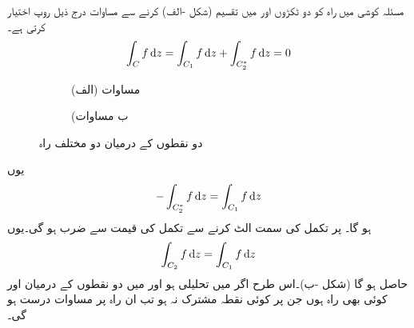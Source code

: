 مسئلہ کوشی میں راہ  کو دو ٹکڑوں  اور  میں تقسیم (شکل -الف) کرنے سے مساوات  درج ذیل روپ اختیار کرتی ہے۔
\begin{align*}
\int_C f\dif z=\int_{C_1} f\dif z+\int_{C^*_2}f\dif z=0
\end{align*}
%
\begin{figure}
\centering
\begin{subfigure}{0.5\textwidth}
\centering
{}
\caption*{(الف) مساوات }
\end{subfigure}%
\begin{subfigure}{0.5\textwidth}
\centering
{}
\caption*{(ب مساوات }
\end{subfigure}%
\caption{دو نقطوں کے درمیان دو مختلف راہ}
\label{شکل_مخلوط_تکمل_مختلف_راہ}
\end{figure}
یوں
\begin{align}\label{مساوات_مخلوط_تکمل_بند_راہ_ٹکڑے_الف}
-\int_{C^*_2}f\dif z=\int_{C_1} f\dif z
\end{align}
ہو گا۔ پر تکمل کی سمت الٹ کرنے سے تکمل کی قیمت  سے ضرب ہو گی۔یوں
\begin{align}\label{مساوات_مخلوط_تکمل_بند_راہ_ٹکڑے_ب}
\int_{C_2}f\dif z=\int_{C_1} f\dif z
\end{align}
حاصل ہو گا (شکل -ب)۔اس طرح اگر  میں  تحلیلی ہو اور  میں دو نقطوں کے درمیان  اور  کوئی بھی راہ ہوں جن پر کوئی نقطہ مشترک نہ ہو تب ان راہ پر مساوات  درست ہو گی۔

